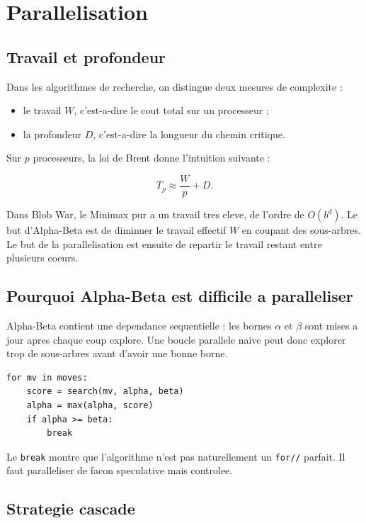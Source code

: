 \documentclass[12pt,a4paper]{article}
\begin{document}
    \section{Parallelisation }

    \subsection{Travail et profondeur}

    Dans les algorithmes de recherche, on distingue deux mesures de complexite :
    \begin{itemize}[nosep]
    \item le travail $W$, c'est-a-dire le cout total sur un processeur ;
    \item la profondeur $D$, c'est-a-dire la longueur du chemin critique.
    \end{itemize}

    Sur $p$ processeurs, la loi de Brent donne l'intuition suivante :

    \[
        T_p \approx \frac{W}{p} + D.
    \]

    Dans Blob War, le Minimax pur a un travail tres eleve, de l'ordre de $O(b^d)$. Le but d'Alpha-Beta
    est de diminuer le travail effectif $W$ en coupant des sous-arbres. Le but de la parallelisation est
    ensuite de repartir le travail restant entre plusieurs coeurs.

    \subsection{Pourquoi Alpha-Beta est difficile a paralleliser}

    Alpha-Beta contient une dependance sequentielle : les bornes $\alpha$ et $\beta$ sont mises a jour
    apres chaque coup explore. Une boucle parallele naive peut donc explorer trop de sous-arbres avant
    d'avoir une bonne borne.

    \begin{lstlisting}
for mv in moves:
    score = search(mv, alpha, beta)
    alpha = max(alpha, score)
    if alpha >= beta:
        break
    \end{lstlisting}

    Le \texttt{break} montre que l'algorithme n'est pas naturellement un \texttt{for//} parfait. Il faut
    paralleliser de facon speculative mais controlee.

    \subsection{Strategie cascade }
\end{document}
